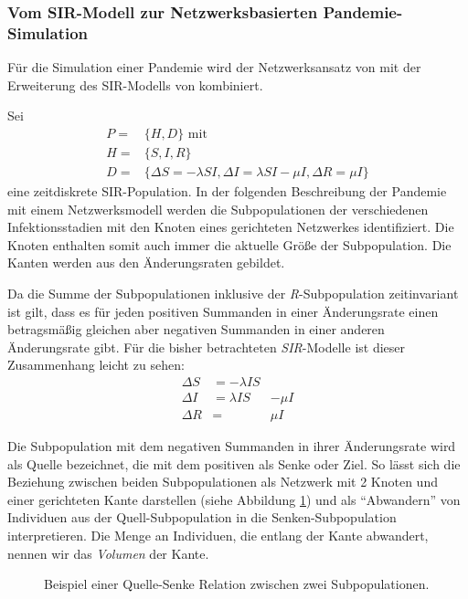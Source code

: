 \subsubsection{Vom SIR-Modell zur Netzwerksbasierten Pandemie-Simulation}
Für die Simulation einer Pandemie wird der Netzwerksansatz von \citep{Capasso1978} mit der Erweiterung des SIR-Modells von \citep{Sattenspiel1995} kombiniert. 

Sei 
\begin{align}
	P=&\lbrace H, D\rbrace \text{ mit}\label{eq:ssec:multiPop:SIRBegin}\\
	H=&\lbrace S, I, R\rbrace\\
	D=&\lbrace \Delta S= -\lambda SI, \Delta I = \lambda SI - \mu I, \Delta R = \mu I   \rbrace \label{eq:ssec:multiPop:SIREnd}
\end{align}
eine zeitdiskrete SIR-Population. In der folgenden Beschreibung der Pandemie mit einem Netzwerksmodell werden die Subpopulationen der verschiedenen Infektionsstadien mit den Knoten eines gerichteten Netzwerkes identifiziert. Die Knoten enthalten somit auch immer die aktuelle Größe der Subpopulation. Die Kanten werden aus den Änderungsraten gebildet. 

Da die Summe der Subpopulationen inklusive der \emph{R}-Subpopulation zeitinvariant ist gilt, dass es für jeden positiven Summanden in einer Änderungsrate einen betragsmäßig gleichen aber negativen Summanden in einer anderen Änderungsrate gibt. Für die bisher betrachteten \emph{SIR}-Modelle ist dieser Zusammenhang leicht zu sehen:
\begin{align}
	\Delta S & = -\lambda IS & \\
	\Delta I & = \lambda IS & - \mu I \\
	\Delta R & = & \mu I
\end{align}

Die Subpopulation mit dem negativen Summanden in ihrer Änderungsrate wird als Quelle bezeichnet, die mit dem positiven als Senke oder Ziel. So lässt sich die Beziehung zwischen beiden Subpopulationen als Netzwerk mit 2 Knoten und einer gerichteten Kante darstellen (siehe Abbildung \ref{fig:ssec:multiPop:simpleDirectedEdge}) und als ``Abwandern'' von Individuen aus der Quell-Subpopulation in die Senken-Subpopulation interpretieren. Die Menge an Individuen, die entlang der Kante abwandert, nennen wir das \emph{Volumen} der Kante. 

\begin{figure}
\begin{center}\end{center}
\caption{Beispiel einer Quelle-Senke Relation zwischen zwei Subpopulationen.}\label{fig:ssec:multiPop:simpleDirectedEdge}
\end{figure}

